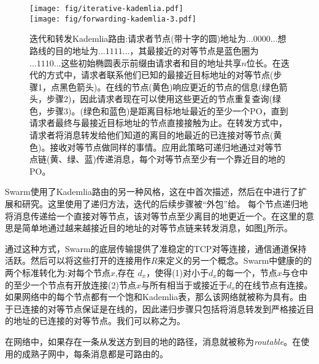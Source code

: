 \begin{figure}[htbp]
   \centering
   \vspace{-2cm} 
   \texttt{[image: fig/iterative-kademlia.pdf]} \\\vspace{-1.3cm}
   \texttt{[image: fig/forwarding-kademlia-3.pdf]}
   \caption[iterative式和forwarding式Kademlia路由\statusgreen]{迭代和转发Kademlia路由:请求者节点(带十字的圆)地址为$...0000...$想路线的目的地址为$...1111...$，其最接近的对等节点是蓝色圈为$...1110...$这些初始椭圆表示前缀由请求者和目的地址共享$n$位长。在迭代的方式中，请求者联系他们已知的最接近目标地址的对等节点(步骤1，点黑色箭头)。在线的节点(黄色)响应更近的节点的信息(绿色箭头，步骤2)，因此请求者现在可以使用这些更近的节点重复查询(绿色，步骤3)。(绿色和蓝色)是距离目标地址最近的至少一个PO，直到请求者最终与最接近目标地址的节点直接接触为止。在转发方式中，请求者将消息转发给他们知道的离目的地最近的已连接对等节点(黄色)。接收对等节点做同样的事情。应用此策略可递归地通过对等节点链(黄、绿、蓝)传递消息，每个对等节点至少有一个靠近目的地的PO。}
   \label{fig:iterative-forwarding-kademlia}
\end{figure}


Swarm使用了Kademlia路由的另一种风格，这在\cite{heep2010r}中首次描述，然后在\cite{tronetal2019-network}中进行了扩展和研究。这里使用了递归方法，迭代的后续步骤被“外包”给。
每个节点递归地将消息传递给一个直接对等节点，该对等节点至少离目的地更近一个。在这里的意思是简单地通过越来越接近目的地址的对等节点链来转发消息，如图\ref{fig:iterative-forwarding-kademlia}所示。


通过这种方式，Swarm的底层传输提供了准稳定的TCP对等连接，通信通道保持活跃。然后可以将这些打开的连接用作$R$来定义的另一个概念。Swarm中健康的的两个标准转化为:对每个节点$x$,存在 $d_x$，使得(1)对小于$d_x$的每一个，节点$x$与仓中的至少一个节点有开放连接(2)节点$x$与所有相当于或接近于$d_x$的在线节点有连接。如果网络中的每个节点都有一个饱和Kademlia表，那么该网络就被称为具有。由于已连接的对等节点保证是在线的，因此递归步骤只包括将消息转发到严格接近目的地址的已连接的对等节点。我们可以称之为。


在网络中，如果存在一条从发送方到目的地的路径，消息就被称为\emph{routable}。在使用的成熟子网中，每条消息都是可路由的。

